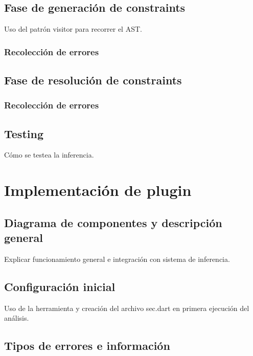 \subsection{Fase de generación de constraints}
Uso del patrón visitor para recorrer el AST.

\subsubsection{Recolección de errores}

\subsection{Fase de resolución de constraints}

\subsubsection{Recolección de errores}

\subsection{Testing}
Cómo se testea la inferencia.

\section{Implementación de plugin}

\subsection{Diagrama de componentes y descripción general}
Explicar funcionamiento general e integración con sistema de inferencia.

\subsection{Configuración inicial}
Uso de la herramienta y creación del archivo sec.dart en primera ejecución del análisis.

\subsection{Tipos de errores e información}

